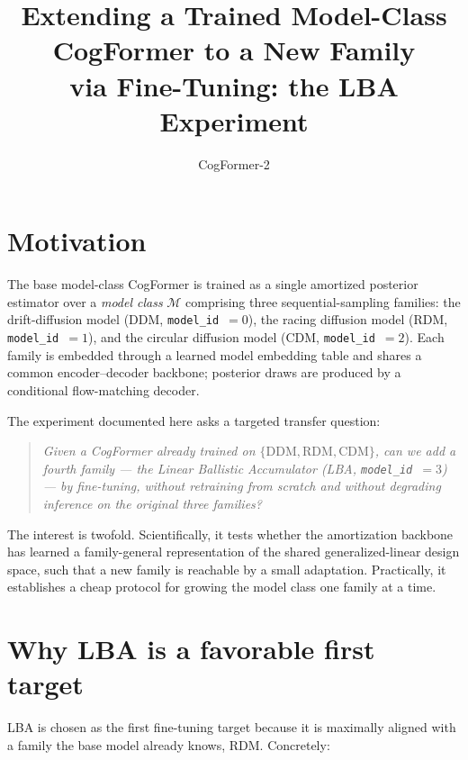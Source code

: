\documentclass[11pt]{article}
\title{Extending a Trained Model-Class CogFormer to a New Family\\
       via Fine-Tuning: the LBA Experiment}
\author{CogFormer-2}
\date{}
\newcommand{\clM}{\mathcal{M}}
\begin{document}
\maketitle

\section{Motivation}

The base model-class CogFormer is trained as a single amortized posterior
estimator over a \emph{model class} $\clM$ comprising three sequential-sampling
families: the drift-diffusion model (DDM, \texttt{model\_id}~$=0$), the racing
diffusion model (RDM, \texttt{model\_id}~$=1$), and the circular diffusion model
(CDM, \texttt{model\_id}~$=2$). Each family is embedded through a learned model
embedding table and shares a common encoder--decoder backbone; posterior draws
are produced by a conditional flow-matching decoder.

The experiment documented here asks a targeted transfer question:

\begin{quote}
\emph{Given a CogFormer already trained on $\{\text{DDM},\text{RDM},\text{CDM}\}$,
can we add a fourth family --- the Linear Ballistic Accumulator (LBA,
\texttt{model\_id}~$=3$) --- by fine-tuning, without retraining from scratch and
without degrading inference on the original three families?}
\end{quote}

The interest is twofold. Scientifically, it tests whether the amortization
backbone has learned a family-general representation of the shared
generalized-linear design space, such that a new family is reachable by a small
adaptation. Practically, it establishes a cheap protocol for growing the model
class one family at a time.

\section{Why LBA is a favorable first target}

LBA is chosen as the first fine-tuning target because it is maximally aligned
with a family the base model already knows, RDM. Concretely:
\end{document}
